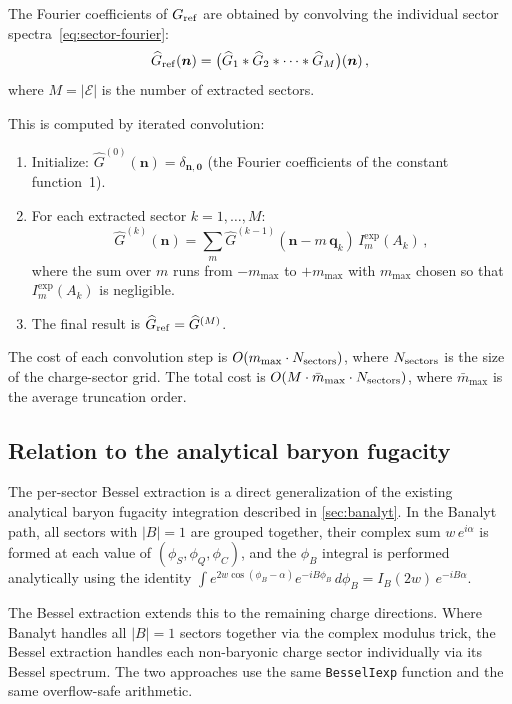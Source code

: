 \documentclass[11pt,a4paper]{article}
\newcommand{\bq}{\bm{q}}
\begin{document}
The Fourier coefficients of $G_{\rm ref}$ are obtained by convolving the individual sector spectra~\cref{eq:sector-fourier}:
\begin{equation}\label{eq:iterated-conv}
  \widehat{G}_{\rm ref}(\bm{n}) = \bigl(\widehat{G}_1 * \widehat{G}_2 * \cdots * \widehat{G}_M\bigr)(\bm{n})\,,
\end{equation}
where $M = |\mathcal{E}|$ is the number of extracted sectors.

This is computed by iterated convolution:
\begin{enumerate}
  \item Initialize: $\widehat{G}^{(0)}(\bm{n}) = \delta_{\bm{n}, \bm{0}}$ (the Fourier coefficients of the constant function~1).
  \item For each extracted sector $k = 1, \ldots, M$:
  \begin{equation}\label{eq:conv-step}
    \widehat{G}^{(k)}(\bm{n}) = \sum_{m} \widehat{G}^{(k-1)}(\bm{n} - m\,\bq_k)\,I_m^{\exp}(A_k)\,,
  \end{equation}
  where the sum over $m$ runs from $-m_{\max}$ to $+m_{\max}$ with $m_{\max}$ chosen so that $I_m^{\exp}(A_k)$ is negligible.
  \item The final result is $\widehat{G}_{\rm ref} = \widehat{G}^{(M)}$.
\end{enumerate}

The cost of each convolution step is $O(m_{\max} \cdot N_{\rm sectors})$, where $N_{\rm sectors}$ is the size of the charge-sector grid.
The total cost is $O(M \cdot \bar{m}_{\max} \cdot N_{\rm sectors})$, where $\bar{m}_{\max}$ is the average truncation order.

\subsection{Relation to the analytical baryon fugacity}
\label{sec:relation-banalyt}

The per-sector Bessel extraction is a direct generalization of the existing analytical baryon fugacity integration described in \cref{sec:banalyt}.
In the Banalyt path, all sectors with $|B| = 1$ are grouped together, their complex sum $w\,e^{i\alpha}$ is formed at each value of $(\phi_S, \phi_Q, \phi_C)$, and the $\phi_B$ integral is performed analytically using the identity $\int e^{2w\cos(\phi_B - \alpha)} e^{-iB\phi_B}\,d\phi_B = I_B(2w)\,e^{-iB\alpha}$.

The Bessel extraction extends this to the remaining charge directions.
Where Banalyt handles all $|B|=1$ sectors together via the complex modulus trick, the Bessel extraction handles each non-baryonic charge sector individually via its Bessel spectrum.
The two approaches use the same \texttt{BesselIexp} function and the same overflow-safe arithmetic.
\end{document}

